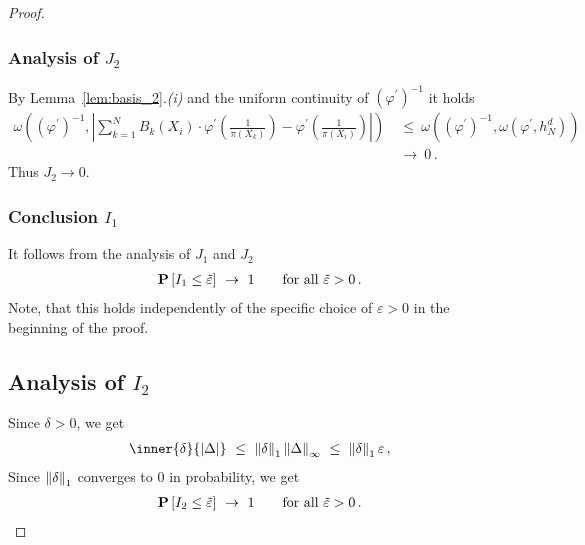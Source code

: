 \begin{proof}
\subsubsection*{Analysis of $J_2$}
By Lemma~\ref{lem:basis_2}.\textit{(i)}
and the uniform continuity of 
$
  (
  \varphi^{'}
  )
  ^{-1}
$
it holds
\begin{align*}
\omega
\left(
  (
  \varphi^{'}
  )
  ^{-1}
  ,
  \left|
    \sum_{k=1}^{N}
  B_k(X_i)
  \cdot
  \varphi^{'}
  \left(
    \frac
    {1}
    {\pi(X_k)}
  \right)
  -
  \varphi^{'}
  \left(
    \frac
    {1}
    {\pi(X_i)}
  \right)
  \right|
  \right)
  &
  \ 
  \le
  \ 
\omega
\left(
  (
  \varphi^{'}
  )
  ^{-1}
  ,
\omega
\left(
  \varphi^{'}
  ,
  h_N^d
  \right)
  \right)
  \\
  &
  \ 
  \to
  \ 
  0
  \,.
\end{align*}
Thus $J_2\to 0$.
\subsubsection*{Conclusion $I_1$}
It follows from the analysis of $J_1$ and $J_2$
\begin{align*}
  \P
  \left[
  I_1 \le \tilde{\varepsilon}
  \right]
  \ 
  \to
  \ 
  1
  \qquad
  \text{for all}\ 
  \tilde{\varepsilon}>0
  \,.
\end{align*}
Note, that this holds independently of the specific choice of $\varepsilon>0$ in the beginning of the proof.
\subsection*{Analysis of $I_2$}
Since
$\delta>0$,
we get
\begin{align*}
     \inner{\delta}
     {|\Delta|}
     \ 
     \le
     \ 
     \norm{\delta}_1
     \norm{\Delta}_\infty
     \ 
     \le
     \ 
     \norm{\delta}_1
     \varepsilon
     \,,
\end{align*}
Since $\left\lVert\delta\right\rVert_1$ converges to $0$ in probability, we get
\begin{align*}
  \P
  \left[
  I_2 \le \tilde{\varepsilon}
  \right]
  \ 
  \to
  \ 
  1
  \qquad
  \text{for all}\ 
  \tilde{\varepsilon}>0
  \,.
\end{align*}

\end{proof}

